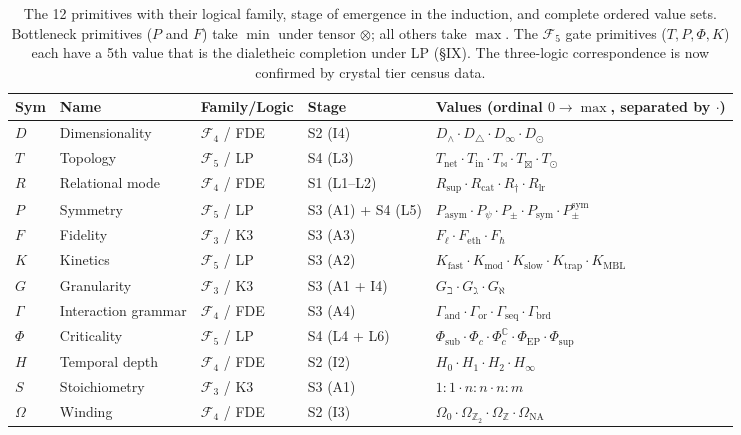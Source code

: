 \documentclass[12pt,a4paper]{article}
\newcommand{\pilcrow}{\S}
\begin{document}
\begin{table}[htbp]
\centering
\small
{}
\begin{tabular}{>{\centering\arraybackslash}p{0.5cm} >{\centering\arraybackslash}p{2.5cm} >{\centering\arraybackslash}p{1.9cm} >{\centering\arraybackslash}p{1.4cm} >{\raggedright\arraybackslash}p{7.8cm}}
\toprule
\rowcolor{gray!25}\textbf{Sym} & \textbf{Name} & \textbf{Family/Logic} & \textbf{Stage} & \textbf{Values (ordinal $0 \to \max$, separated by $\cdot$)} \\
\midrule
\rowcolors{1}{white}{gray!10}
$D$ & Dimensionality & $\mathcal{F}_4$ / FDE & S2 (I4) & $D_\wedge \cdot D_\triangle \cdot D_\infty \cdot D_\odot$ \\
$T$ & Topology & $\mathcal{F}_5$ / LP & S4 (L3) & $T_\text{net} \cdot T_\text{in} \cdot T_{\bowtie} \cdot T_{\boxtimes} \cdot T_\odot$ \\
$R$ & Relational mode & $\mathcal{F}_4$ / FDE & S1 (L1--L2) & $R_\text{sup} \cdot R_\text{cat} \cdot R_\dagger \cdot R_\text{lr}$ \\
$P$ & Symmetry & $\mathcal{F}_5$ / LP & S3 (A1) + S4 (L5) & $P_\text{asym} \cdot P_\psi \cdot P_\pm \cdot P_\text{sym} \cdot P_{\pm}^{\text{sym}}$ \\
$F$ & Fidelity & $\mathcal{F}_3$ / K3 & S3 (A3) & $F_\ell \cdot F_\text{eth} \cdot F_\hbar$ \\
$K$ & Kinetics & $\mathcal{F}_5$ / LP & S3 (A2) & $K_\text{fast} \cdot K_\text{mod} \cdot K_\text{slow} \cdot K_\text{trap} \cdot K_\text{MBL}$ \\
$G$ & Granularity & $\mathcal{F}_3$ / K3 & S3 (A1 + I4) & $G_\beth \cdot G_\gimel \cdot G_\aleph$ \\
$\Gamma$ & Interaction grammar & $\mathcal{F}_4$ / FDE & S3 (A4) & $\Gamma_\text{and} \cdot \Gamma_\text{or} \cdot \Gamma_\text{seq} \cdot \Gamma_\text{brd}$ \\
$\Phi$ & Criticality & $\mathcal{F}_5$ / LP & S4 (L4 + L6) & $\Phi_\text{sub} \cdot \Phi_c \cdot \Phi_c^\mathbb{C} \cdot \Phi_\text{EP} \cdot \Phi_\text{sup}$ \\
$H$ & Temporal depth & $\mathcal{F}_4$ / FDE & S2 (I2) & $H_0 \cdot H_1 \cdot H_2 \cdot H_\infty$ \\
$S$ & Stoichiometry & $\mathcal{F}_3$ / K3 & S3 (A1) & $1{:}1 \cdot n{:}n \cdot n{:}m$ \\
$\Omega$ & Winding & $\mathcal{F}_4$ / FDE & S2 (I3) & $\Omega_0 \cdot \Omega_{\mathbb{Z}_2} \cdot \Omega_\mathbb{Z} \cdot \Omega_\text{NA}$ \\
\bottomrule
\end{tabular}
\caption{The 12 primitives with their logical family, stage of emergence in the induction, and complete ordered value sets. Bottleneck primitives ($P$ and $F$) take $\min$ under tensor $\otimes$; all others take $\max$. The $\mathcal{F}_5$ gate primitives ($T, P, \Phi, K$) each have a 5th value that is the dialetheic completion under LP (\pilcrow{}IX). The three-logic correspondence is now confirmed by crystal tier census data.}
\label{tab:primitive-reference}
\end{table}
\end{document}

